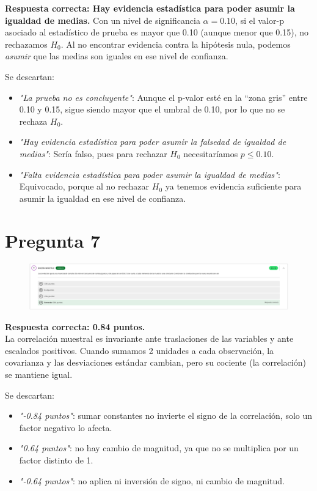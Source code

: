 \documentclass[10pt]{article}
\begin{document}
\textbf{Respuesta correcta: Hay evidencia estadística para poder asumir la igualdad de medias.}  
Con un nivel de significancia \(\alpha=0.10\), si el valor-p asociado al estadístico de prueba es mayor que 0.10 (aunque menor que 0.15), no rechazamos \(H_0\). Al no encontrar evidencia contra la hipótesis nula, podemos \emph{asumir} que las medias son iguales en ese nivel de confianza.

Se descartan:
\begin{itemize}
  \item \textit{"La prueba no es concluyente"}: Aunque el p-valor esté en la “zona gris” entre 0.10 y 0.15, sigue siendo mayor que el umbral de 0.10, por lo que no se rechaza \(H_0\).
  \item \textit{"Hay evidencia estadística para poder asumir la falsedad de igualdad de medias"}: Sería falso, pues para rechazar \(H_0\) necesitaríamos \(p\le0.10\).
  \item \textit{"Falta evidencia estadística para poder asumir la igualdad de medias"}: Equivocado, porque al no rechazar \(H_0\) ya tenemos evidencia suficiente para asumir la igualdad en ese nivel de confianza.
\end{itemize}
\section{Pregunta 7}
\begin{figure}[H]
    \centering
    \includegraphics[width=1\textwidth]{images/pregunta7.png}
\end{figure}

\textbf{Respuesta correcta: 0.84 puntos.} \\
La correlación muestral es invariante ante traslaciones de las variables y ante escalados positivos. Cuando sumamos 2 unidades a cada observación, la covarianza y las desviaciones estándar cambian, pero su cociente (la correlación) se mantiene igual.

Se descartan:
\begin{itemize}
    \item \textit{"-0.84 puntos"}: sumar constantes no invierte el signo de la correlación, solo un factor negativo lo afecta.
    \item \textit{"0.64 puntos"}: no hay cambio de magnitud, ya que no se multiplica por un factor distinto de 1.
    \item \textit{"-0.64 puntos"}: no aplica ni inversión de signo, ni cambio de magnitud.
\end{itemize}
\end{document}

